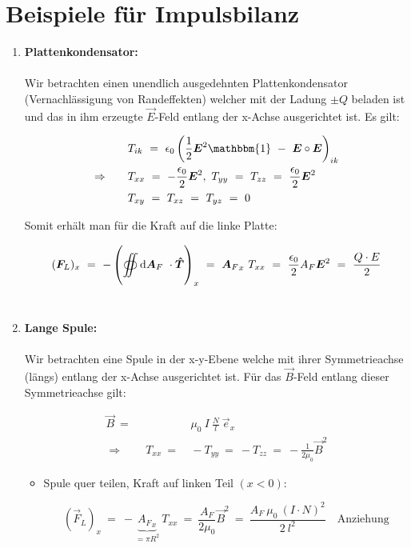 \section{Beispiele für Impulsbilanz}

\begin{enumerate}
\item \textbf{ Plattenkondensator:}\\
\ \\
Wir betrachten einen unendlich ausgedehnten Plattenkondensator (Vernachlässigung von Randeffekten) welcher mit der Ladung $\pm Q$ beladen ist und das in ihm erzeugte $\vec{E}$-Feld entlang der x-Achse ausgerichtet ist. Es gilt:

\begin{align*}
& T_{ik} \ = \ \epsilon_0 \left(\frac{1}{2}\vec{E}^2\mathbbm{1} \ - \ \vec{E}\circ\vec{E}\right)_{ik}\\
\Rightarrow \qquad & T_{xx} \ = \ -\frac{\epsilon_0}{2}\vec{E}^2, \ T_{yy} \ = \ T_{zz} \ = \ \frac{\epsilon_0}{2} \vec{E}^2\\
& T_{xy} \ = \ T_{xz} \ = \ T_{yz} \ = \ 0
\end{align*}

Somit erhält man für die Kraft auf die linke Platte:

\begin{equation*}
(\vec{F}_L)_x \ = \ - \left( \Oiint{}{}{\vec{A}_F} \cdot \tens{T}\right)_x \ = \ {\vec{A}_F}_x \ T_{xx} \ = \ \frac{\epsilon_0}{2} A_F \vec{E}^2 \ = \ \frac{Q\cdot E}{2}  
\end{equation*}
\ \\
\item \textbf{ Lange Spule:}\\
\ \\
Wir betrachten eine Spule in der x-y-Ebene welche mit ihrer Symmetrieachse (längs) entlang der x-Achse ausgerichtet ist.
Für das $\vec{B}$-Feld entlang dieser Symmetrieachse gilt:

\begin{align*}
\vec{B} \ =& \ \mu_0 \ I \ \frac{N}{l} \ \vec{e}_x\\
\Rightarrow \qquad T_{xx} \ =& \ - T_{yy} \ = \ -T_{zz} \ = \ - \frac{1}{2\mu_0}\vec{B}^2
\end{align*}

\begin{itemize}
\item Spule quer teilen, Kraft auf linken Teil $(x<0)$:

\begin{equation*}
(\vec{F}_L)_x \ = \ - \underbrace{{A_F}_x}_{= \pi R^2} \ T_{xx} \ = \ \frac{A_F}{2\mu_0}\vec{B}^2 \ = \ \frac{A_F \ \mu_0 \ (I \cdot N)^2}{2\ l^2} \quad \text{Anziehung}
\end{equation*}


\end{itemize}
\end{enumerate}
